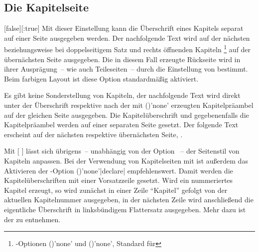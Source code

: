\begin{Declaration*}{}
\begin{Declaration*}{}
\begin{Declaration*}{}
\subsection{Die Kapitelseite}
\begin{Declaration}{}%
  [false][:true]%
\printdeclarationlist%
%
%
%
%
%
%
Mit dieser Einstellung kann die Überschrift eines Kapitels separat auf einer 
Seite ausgegeben werden. Der nachfolgende Text wird auf der nächsten 
beziehungsweise bei doppelseitigem Satz und rechts öffnenden Kapiteln%
\footnote{%
  \KOMAScript-Optionen ()'none' und 
  ()'none', Standard für 
}
auf der übernächsten Seite ausgegeben. Die in diesem Fall erzeugte Rückseite 
wird in ihrer Ausprägung~-- wie auch Teileseiten~-- durch die Einstellung von 
 bestimmt. Beim farbigen Layout ist diese Option 
standardmäßig aktiviert. \notudscrartcl
%
\begin{values}{}
\itemfalse
  Es gibt keine Sonderstellung von Kapiteln, der nachfolgende Text wird direkt 
  unter der Überschrift respektive nach der mit 
  ()'none' erzeugten 
  Kapitelpräambel auf der gleichen Seite ausgegeben.
\itemtrue*
  Die Kapitelüberschrift und gegebenenfalls die Kapitelpräambel werden auf 
  einer separaten Seite gesetzt. Der folgende Text erscheint auf der nächsten 
  respektive übernächsten Seite, .
\end{values}
%
Mit [%
]
lässt sich übrigens~-- unabhängig von der Option ~-- der 
Seitenstil von Kapiteln anpassen. Bei der Verwendung von Kapitelseiten mit 
 ist außerdem das Aktivieren der \KOMAScript-Option 
()'none'|declare| 
empfehlenswert. Damit werden die Kapitelüberschriften mit einer Vorsatzzeile 
gesetzt. Wird ein nummeriertes Kapitel erzeugt, so wird zunächst in einer Zeile 
\enquote{Kapitel} gefolgt von der aktuellen Kapitelnummer ausgegeben, in der 
nächsten Zeile wird anschließend die eigentliche Überschrift in linksbündigem 
Flattersatz ausgegeben. Mehr dazu ist der  
zu entnehmen.
\end{Declaration}



\end{Declaration*}
\end{Declaration*}
\end{Declaration*}
